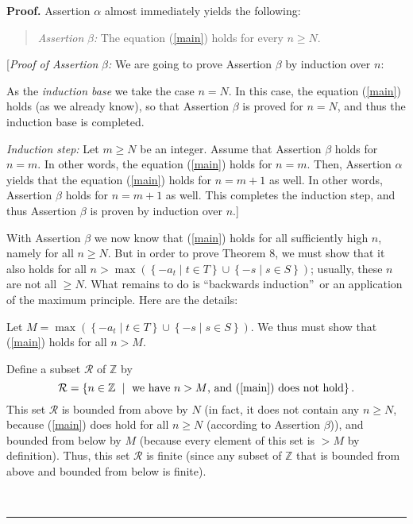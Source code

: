 \documentclass[numbers=enddot,12pt,final,onecolumn,notitlepage]{scrartcl}%
\numberwithin{exer}{section}
\theoremstyle{definition}
\newenvironment{statement}{\begin{quote}}{\end{quote}}
\newenvironment{proof}[1][Proof]{\noindent\textbf{#1.} }{\ \rule{0.5em}{0.5em}}
\begin{document}
\begin{proof}
Assertion $\alpha$ almost immediately yields the following:

\begin{statement}
\textit{Assertion }$\beta$\textit{:} The equation (\ref{main}) holds for every
$n\geq N$.
\end{statement}

[\textit{Proof of Assertion }$\beta$\textit{:} We are going to prove Assertion
$\beta$ by induction over $n$:

As the \textit{induction base} we take the case $n=N$. In this case, the
equation (\ref{main}) holds (as we already know), so that Assertion $\beta$ is
proved for $n=N$, and thus the induction base is completed.

\textit{Induction step:} Let $m\geq N$ be an integer. Assume that Assertion
$\beta$ holds for $n=m$. In other words, the equation (\ref{main}) holds for
$n=m$. Then, Assertion $\alpha$ yields that the equation (\ref{main}) holds
for $n=m+1$ as well. In other words, Assertion $\beta$ holds for $n=m+1$ as
well. This completes the induction step, and thus Assertion $\beta$ is proven
by induction over $n$.]

With Assertion $\beta$ we now know that (\ref{main}) holds for all
sufficiently high $n$, namely for all $n\geq N$. But in order to prove Theorem
8, we must show that it also holds for all $n>\max\left(  \left\{  -a_{t}\mid
t\in T\right\}  \cup\left\{  -s\mid s\in S\right\}  \right)  $; usually, these
$n$ are not all $\geq N$. What remains to do is \textquotedblleft backwards
induction\textquotedblright\ or an application of the maximum principle. Here
are the details:

Let $M=\max\left(  \left\{  -a_{t}\mid t\in T\right\}  \cup\left\{  -s\mid
s\in S\right\}  \right)  $. We thus must show that (\ref{main}) holds for all
$n>M$.

Define a subset $\mathcal{R}$ of $\mathbb{Z}$ by%
\begin{equation}
\mathcal{R}=\left\{  n\in\mathbb{Z}\ \mid\ \text{we have }n>M\text{, and
(\ref{main}) does not hold}\right\}  . \label{defR}%
\end{equation}
This set $\mathcal{R}$ is bounded from above by $N$ (in fact, it does not
contain any $n\geq N$, because (\ref{main}) does hold for all $n\geq N$
(according to Assertion $\beta$)), and bounded from below by $M$ (because
every element of this set is $>M$ by definition). Thus, this set $\mathcal{R}$
is finite (since any subset of $\mathbb{Z}$ that is bounded from above and
bounded from below is finite).


\end{proof}
\end{document}
